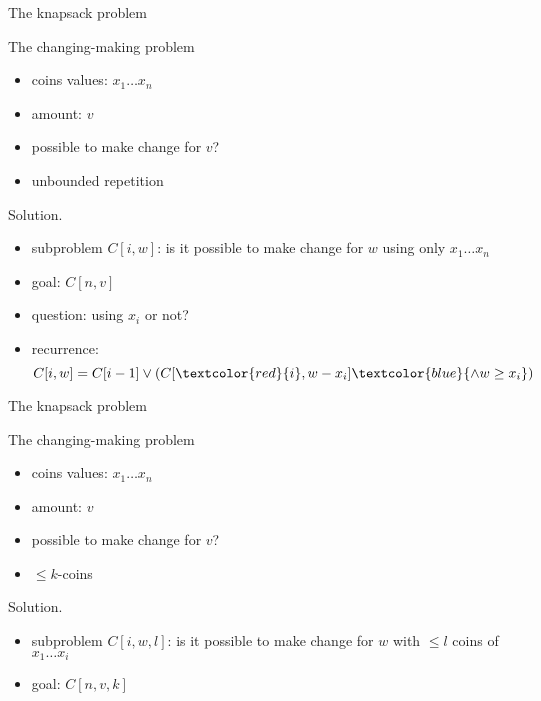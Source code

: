 \begin{frame}{The knapsack problem}
  \begin{exampleblock}{The changing-making problem }
    \begin{itemize}
      \item coins values: $x_{1} \dots x_{n}$
      \item amount: $v$
      \item possible to make change for $v$?
      \item unbounded repetition
    \end{itemize}
  \end{exampleblock}
  
  \begin{block}{Solution.}
    \begin{itemize}
      \item subproblem $C[i, w]$: is it possible to make change for $w$ using only $x_{1} \dots x_{n}$
      \item goal: $C[n,v]$
      \item question: using $x_{i}$ or not?
      \item recurrence:
	\[
	  C[i,w] = C[i-1] \lor (C[\textcolor{red}{i}, w-x_{i}] \textcolor{blue}{\land w \ge x_{i}})
	\]
    \end{itemize}
  \end{block}
\end{frame}
\begin{frame}{The knapsack problem}
  \begin{exampleblock}{The changing-making problem }
    \begin{itemize}
      \item coins values: $x_{1} \dots x_{n}$
      \item amount: $v$
      \item possible to make change for $v$?
      \item $\le k$-coins 
    \end{itemize}
  \end{exampleblock}

  \begin{block}{Solution.}
    \begin{itemize}
      \item subproblem $C[i,w,l]$: is it possible to make change for $w$ with $\le l$ coins of $x_{1} \dots x_{i}$
      \item goal: $C[n,v,k]$
    \end{itemize}
  \end{block}
\end{frame}
